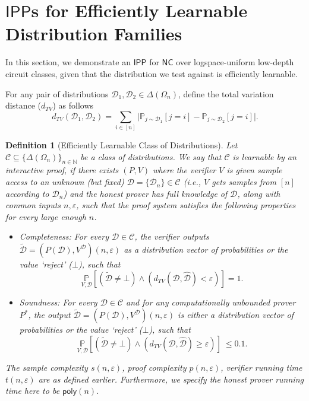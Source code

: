 \documentclass[11pt]{article}
\newtheorem{definition}{Definition}[section]
\newcommand{\poly}{\mathsf{poly}}
\newcommand{\NC}{\mathsf{NC}}
\newcommand{\IPP}{\mathsf{IPP}}
\newcommand{\sD}{\mathcal{D}}
\begin{document}
\section{$\IPP$s for Efficiently Learnable Distribution Families}
\label{sec:eff_learn}
In this section, we demonstrate an $\IPP$ for $\NC$ over logspace-uniform low-depth circuit classes, given that the distribution we test against is efficiently learnable. 

For any pair of distributions $\sD_{1},\sD_{2}\in \Delta(\Omega_{n})$, define the total variation distance ($d_{TV}$) as follows 
\begin{equation*}
    d_{TV}(\sD_{1},\sD_{2})=\sum_{i\in [n]}\big\vert\mathbb{P}_{j\sim \sD_{1}}[j=i]-\mathbb{P}_{j\sim \sD_{2}}[j=i]\big\vert.
\end{equation*}

\begin{definition}[Efficiently Learnable Class of Distributions] 
\label{def:eff_learn_dist_ip}
Let $\mathcal{C}\subseteq \{\Delta(\Omega_n)\}_{n \in \mathbb{N}}$ be a class of distributions. We say that $\mathcal{C}$ is learnable by an interactive proof, if there exists $(P,V)$ where the verifier $V$ is given sample access to an unknown (but fixed) $\sD = \{\sD_n\} \in \mathcal{C}$ (i.e., $V$ gets samples from $[n]$ according to $\sD_n$) and the honest prover has full knowledge of $\sD$, along with common inputs $n,\varepsilon$, such that the proof system satisfies the following properties for every large enough $n$.
\begin{itemize}
   \item Completeness: For every $\sD \in \mathcal{C}$, the verifier outputs $\tilde{\sD} = \left( P(\mathcal{D}),V^{\sD} \right)(n,\varepsilon)$ as a distribution vector of probabilities or the value `reject' ($\bot$), such that
    \begin{equation*}
        \underset{V, \sD}{\mathbb{P}}\left[ (\tilde{\sD} \neq \bot) \land (d_{TV}(\mathcal{D},\hat{\mathcal{D}})<\varepsilon) \right] = 1.
    \end{equation*}
    
    \item Soundness: For every $\sD \in \mathcal{C}$ and for any computationally unbounded prover $P^{\ast}$, the output $\tilde{\sD} = \left( P(\mathcal{D}),V^{\sD} \right)(n,\varepsilon)$ is either a distribution vector of probabilities or the value `reject' ($\bot$), such that
    \begin{equation*}
        \underset{V, \sD}{\mathbb{P}} \left[ (\tilde{\sD} \neq \bot) \land (d_{TV}(\mathcal{D},\hat{\mathcal{D}}) \geq \varepsilon) \right]\ \leq 0.1.
    \end{equation*}
\end{itemize}
The sample complexity $s(n,\varepsilon)$, proof complexity $p(n,\varepsilon)$, verifier running time $t(n,\varepsilon)$ are as defined earlier. Furthermore, we specify the honest prover running time here to be $\poly(n)$.
\end{definition}
\end{document}
